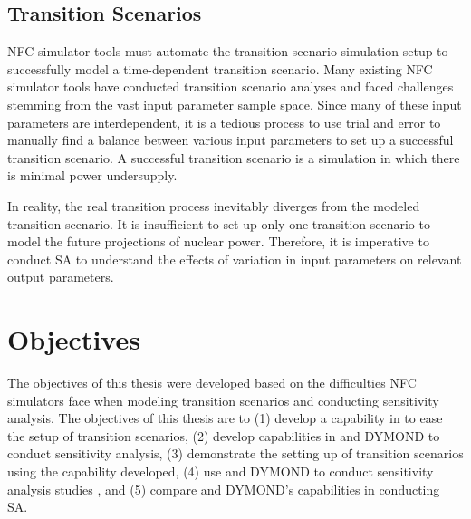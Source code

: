 \subsection{Transition Scenarios}
\gls{NFC} simulator tools must automate the transition scenario simulation 
setup to successfully model a time-dependent transition scenario. 
Many existing \gls{NFC} simulator tools have conducted 
transition scenario analyses 
\cite{feng_standardized_2016,bae_standardized_2019,coquelet-pascal_cosi6:_2015}
and faced challenges stemming from the vast input parameter
sample space.
Since many of these input parameters are interdependent, it is 
a tedious process to use trial and error to manually find a balance 
between various input parameters to set up a successful transition 
scenario. 
A successful transition scenario is a simulation in which there 
is minimal power undersupply.
 
In reality, the real transition process inevitably diverges
from the modeled transition scenario. 
It is insufficient to set up only one transition scenario to model 
the future projections of nuclear power.
Therefore, it is imperative to conduct \gls{SA} to understand 
the effects of variation in input parameters on 
relevant output parameters. 

\section{Objectives}
The objectives of this thesis were developed based on the difficulties 
\gls{NFC} simulators face when modeling transition scenarios 
and conducting sensitivity analysis.
The objectives of this thesis are to 
(1) develop a capability in \Cyclus to ease the setup of 
transition scenarios, 
(2) develop capabilities in \Cyclus and DYMOND to conduct 
sensitivity analysis,
(3) demonstrate the setting up of \Cyclus transition scenarios using the 
capability developed,
(4) use \Cyclus and DYMOND to conduct sensitivity analysis studies
, and
(5) compare \Cyclus and DYMOND's capabilities in conducting \gls{SA}. 
